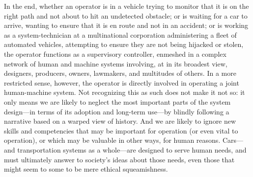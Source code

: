 In the end, whether an operator is in a vehicle trying to monitor that it
is on the right path and not about to hit an undetected
obstacle; or is waiting
for a car to arrive, wanting to ensure that it is en route
and not in an accident; or is working as a system-technician at a
multinational corporation administering a fleet of automated vehicles,
attempting to ensure they are not being 
hijacked or stolen, the operator functions as a supervisory
controller, enmeshed in a complex network of human and machine
systems involving, at in its broadest view, designers, producers,
owners, lawmakers, and multitudes of others. In a more restricted
sense, however, the operator is directly involved in
operating a joint 
human-machine system. Not recognizing this as
such does not make it not so:  it  
only means we are 
likely to neglect the most important parts of the system design---in
terms of its adoption and long-term use---by blindly following a
narrative based on a warped view of history. And we are likely to
ignore new skills and competencies that may be important for
operation (or even vital to operation), or which may be valuable in other ways, for
human reasons. Cars---and transportation systems as a whole---are
designed to serve human needs, and must ultimately answer to society's
ideas about those
needs, even those that might seem to some to be mere ethical squeamishness.






